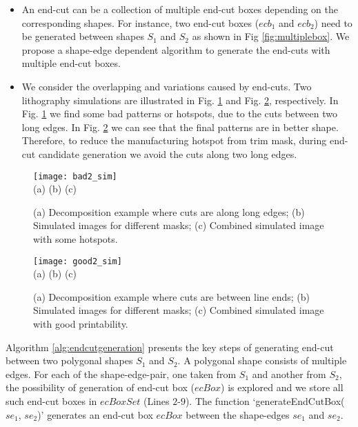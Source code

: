 \documentclass[12pt]{spieman}
\theoremstyle{plain}
\begin{document}
\begin{spacing}{1}
\begin{itemize}
  \item
An end-cut can be a collection of multiple end-cut boxes depending on the corresponding shapes.
For instance, two end-cut boxes ($ecb_{1}$ and $ecb_{2}$) need to be generated between shapes $S_{1}$ and $S_{2}$ as shown in Fig \ref{fig:multiplebox}.
We propose a shape-edge dependent algorithm to generate the end-cuts with multiple end-cut boxes.
  \item
We consider the overlapping and variations caused by end-cuts.
Two lithography simulations are illustrated in Fig. \ref{fig:bad2_sim} and Fig. \ref{fig:good2_sim}, respectively.
In Fig. \ref{fig:bad2_sim} we find some bad patterns or hotspots, due to the cuts between two long edges.
In Fig. \ref{fig:good2_sim} we can see that the final patterns are in better shape. 
Therefore, to reduce the manufacturing hotspot from trim mask, during end-cut candidate generation we avoid the cuts along two long edges.
\end{itemize}

\begin{figure}[htb]
  \centering
  \texttt{[image: bad2\_sim]}
  \\ (a) \hspace{4.0cm} (b) \hspace{4.0cm} (c)
  \caption{
  (a) Decomposition example where cuts are along long edges;
  (b) Simulated images for different masks;
  (c) Combined simulated image with some hotspots.
  }
  \label{fig:bad2_sim}
\end{figure}

\begin{figure}[htb]
  \centering
  \texttt{[image: good2\_sim]}
  \\ (a) \hspace{4.0cm} (b) \hspace{4.0cm} (c)
  \caption{
  (a) Decomposition example where cuts are between line ends;
  (b) Simulated images for different masks;
  (c) Combined simulated image with good printability.
  }
  \label{fig:good2_sim}
\end{figure}


Algorithm \ref{alg:endcutgeneration} presents the key steps of generating end-cut between two polygonal shapes $S_{1}$ and $S_{2}$.
A polygonal shape consists of multiple edges. For each of the shape-edge-pair, one taken from $S_{1}$ and another from $S_{2}$,
the possibility of generation of end-cut box ($ecBox$) is explored and we store all such end-cut boxes in $ecBoxSet$ (Lines $2$-$9$).
The function `generateEndCutBox($se_{1}$, $se_{2}$)' generates an end-cut box $ecBox$ between the shape-edges $se_{1}$ and $se_{2}$. 


\end{spacing}
\end{document}
